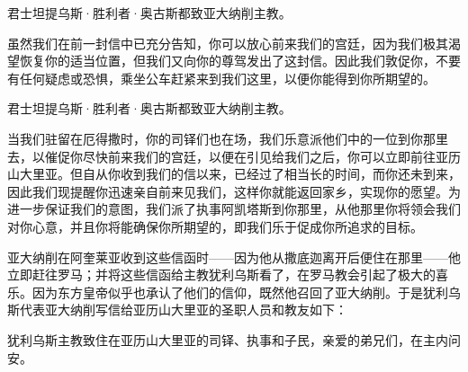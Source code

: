 \par

君士坦提乌斯·胜利者·奥古斯都致亚大纳削主教。\par

虽然我们在前一封信中已充分告知，你可以放心前来我们的宫廷，因为我们极其渴望恢复你的适当位置，但我们又向你的尊驾发出了这封信。因此我们敦促你，不要有任何疑虑或恐惧，乘坐公车赶紧来到我们这里，以便你能得到你所期望的。\par

\par

君士坦提乌斯·胜利者·奥古斯都致亚大纳削主教。\par

当我们驻留在厄得撒时，你的司铎们也在场，我们乐意派他们中的一位到你那里去，以催促你尽快前来我们的宫廷，以便在引见给我们之后，你可以立即前往亚历山大里亚。但自从你收到我们的信以来，已经过了相当长的时间，而你还未到来，因此我们现提醒你迅速亲自前来见我们，这样你就能返回家乡，实现你的愿望。为进一步保证我们的意图，我们派了执事阿凯塔斯到你那里，从他那里你将领会我们对你心意，并且你将能确保你所期望的，即我们乐于促成你所追求的目标。\par

亚大纳削在阿奎莱亚收到这些信函时——因为他从撒底迦离开后便住在那里——他立即赶往罗马；并将这些信函给主教犹利乌斯看了，在罗马教会引起了极大的喜乐。因为东方皇帝似乎也承认了他们的信仰，既然他召回了亚大纳削。于是犹利乌斯代表亚大纳削写信给亚历山大里亚的圣职人员和教友如下：\par

\par

犹利乌斯主教致住在亚历山大里亚的司铎、执事和子民，亲爱的弟兄们，在主内问安。\par


